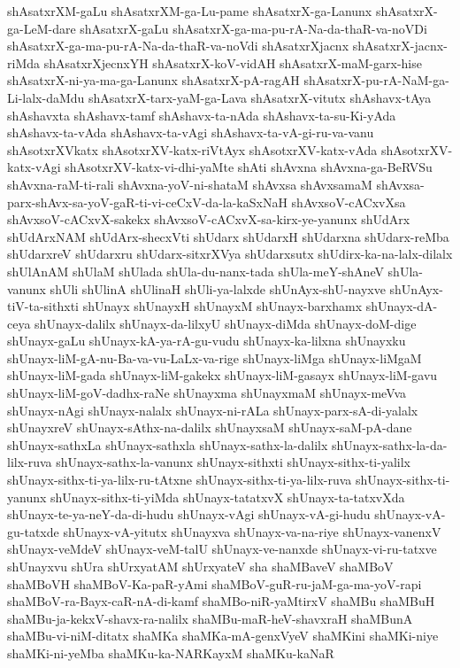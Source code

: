 {shAsatxrXM-gaLu
shAsatxrXM-ga-Lu-pame
shAsatxrX-ga-Lanunx
shAsatxrX-ga-LeM-dare
shAsatxrX-gaLu
shAsatxrX-ga-ma-pu-rA-Na-da-thaR-va-noVDi
shAsatxrX-ga-ma-pu-rA-Na-da-thaR-va-noVdi
shAsatxrXjacnx
shAsatxrX-jacnx-riMda
shAsatxrXjecnxYH
shAsatxrX-koV-vidAH
shAsatxrX-maM-garx-hise
shAsatxrX-ni-ya-ma-ga-Lanunx
shAsatxrX-pA-ragAH
shAsatxrX-pu-rA-NaM-ga-Li-lalx-daMdu
shAsatxrX-tarx-yaM-ga-Lava
shAsatxrX-vitutx
shAshavx-tAya
shAshavxta
shAshavx-tamf
shAshavx-ta-nAda
shAshavx-ta-su-Ki-yAda
shAshavx-ta-vAda
shAshavx-ta-vAgi
shAshavx-ta-vA-gi-ru-va-vanu
shAsotxrXVkatx
shAsotxrXV-katx-riVtAyx
shAsotxrXV-katx-vAda
shAsotxrXV-katx-vAgi
shAsotxrXV-katx-vi-dhi-yaMte
shAti
shAvxna
shAvxna-ga-BeRVSu
shAvxna-raM-ti-rali
shAvxna-yoV-ni-shataM
shAvxsa
shAvxsamaM
shAvxsa-parx-shAvx-sa-yoV-gaR-ti-vi-ceCxV-da-la-kaSxNaH
shAvxsoV-cACxvXsa
shAvxsoV-cACxvX-sakekx
shAvxsoV-cACxvX-sa-kirx-ye-yanunx
shUdArx
shUdArxNAM
shUdArx-shecxVti
shUdarx
shUdarxH
shUdarxna
shUdarx-reMba
shUdarxreV
shUdarxru
shUdarx-sitxrXVya
shUdarxsutx
shUdirx-ka-na-lalx-dilalx
shUlAnAM
shUlaM
shUlada
shUla-du-nanx-tada
shUla-meY-shAneV
shUla-vanunx
shUli
shUlinA
shUlinaH
shUli-ya-lalxde
shUnAyx-shU-nayxve
shUnAyx-tiV-ta-sithxti
shUnayx
shUnayxH
shUnayxM
shUnayx-barxhamx
shUnayx-dA-ceya
shUnayx-dalilx
shUnayx-da-lilxyU
shUnayx-diMda
shUnayx-doM-dige
shUnayx-gaLu
shUnayx-kA-ya-rA-gu-vudu
shUnayx-ka-lilxna
shUnayxku
shUnayx-liM-gA-nu-Ba-va-vu-LaLx-va-rige
shUnayx-liMga
shUnayx-liMgaM
shUnayx-liM-gada
shUnayx-liM-gakekx
shUnayx-liM-gasayx
shUnayx-liM-gavu
shUnayx-liM-goV-dadhx-raNe
shUnayxma
shUnayxmaM
shUnayx-meVva
shUnayx-nAgi
shUnayx-nalalx
shUnayx-ni-rALa
shUnayx-parx-sA-di-yalalx
shUnayxreV
shUnayx-sAthx-na-dalilx
shUnayxsaM
shUnayx-saM-pA-dane
shUnayx-sathxLa
shUnayx-sathxla
shUnayx-sathx-la-dalilx
shUnayx-sathx-la-da-lilx-ruva
shUnayx-sathx-la-vanunx
shUnayx-sithxti
shUnayx-sithx-ti-yalilx
shUnayx-sithx-ti-ya-lilx-ru-tAtxne
shUnayx-sithx-ti-ya-lilx-ruva
shUnayx-sithx-ti-yanunx
shUnayx-sithx-ti-yiMda
shUnayx-tatatxvX
shUnayx-ta-tatxvXda
shUnayx-te-ya-neY-da-di-hudu
shUnayx-vAgi
shUnayx-vA-gi-hudu
shUnayx-vA-gu-tatxde
shUnayx-vA-yitutx
shUnayxva
shUnayx-va-na-riye
shUnayx-vanenxV
shUnayx-veMdeV
shUnayx-veM-talU
shUnayx-ve-nanxde
shUnayx-vi-ru-tatxve
shUnayxvu
shUra
shUrxyatAM
shUrxyateV
sha
shaMBaveV
shaMBoV
shaMBoVH
shaMBoV-Ka-paR-yAmi
shaMBoV-guR-ru-jaM-ga-ma-yoV-rapi
shaMBoV-ra-Bayx-caR-nA-di-kamf
shaMBo-niR-yaMtirxV
shaMBu
shaMBuH
shaMBu-ja-kekxV-shavx-ra-nalilx
shaMBu-maR-heV-shavxraH
shaMBunA
shaMBu-vi-niM-ditatx
shaMKa
shaMKa-mA-genxVyeV
shaMKini
shaMKi-niye
shaMKi-ni-yeMba
shaMKu-ka-NARKayxM
shaMKu-kaNaR
}
